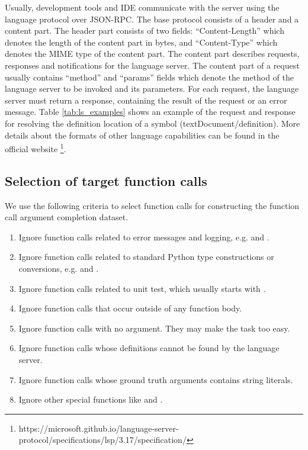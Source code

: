 Usually, development tools and IDE communicate with the server using the language protocol over JSON-RPC. 
The base protocol consists of a header and a content part. The header part consists of two fields: ``Content-Length'' which denotes the length of the content part in bytes, and ``Content-Type'' which denotes the MIME type of the content part. 
The content part describes requests, responses and notifications for the language server. 
The content part of a request usually contains ``method'' and ``params''  fields which denote the method of the language server to be invoked and its parameters. 
For each request, the language server must return a response, containing the result of the request or an error message. 
Table \ref{tab:ls_examples} shows an example of the request and response for resolving the definition location of a symbol (textDocument/definition). 
More details about the formats of other language capabilities can be found in the official website \footnote{https://microsoft.github.io/language-server-protocol/specifications/lsp/3.17/specification/}.

\subsection{Selection of target function calls}
\label{sec:criteria}

We use the following criteria to select function calls for constructing the function call argument completion dataset.
\begin{enumerate}
    \item Ignore function calls related to error messages and logging, e.g.  and .
    \item Ignore function calls related to standard Python type constructions or conversions, e.g.  and .
    \item Ignore function calls related to unit test, which usually starts with .
    \item Ignore function calls that occur outside of any function body.
    \item Ignore function calls with no argument. They may make the task too easy.
    \item Ignore function calls whose definitions cannot be found by the language server.
    \item Ignore function calls whose ground truth arguments contains string literals. 
    \item Ignore other special functions like  and .
\end{enumerate}

